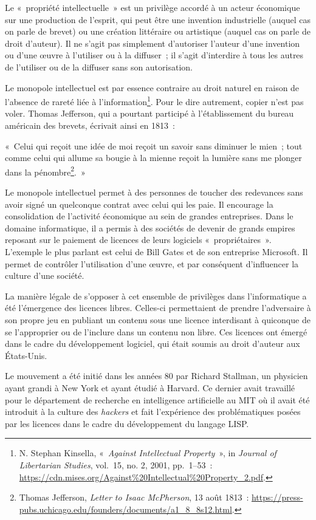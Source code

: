 \documentclass[
  a5paper,
  smalldemyvopaper,10pt,twoside,onecolumn,openright,extrafontsizes,hidelinks]{memoir}
\begin{document}
Le «~propriété intellectuelle~» est un privilège accordé à un acteur
économique sur une production de l'esprit, qui peut être une invention
industrielle (auquel cas on parle de brevet) ou une création littéraire
ou artistique (auquel cas on parle de droit d'auteur). Il ne s'agit pas
simplement d'autoriser l'auteur d'une invention ou d'une œuvre à
l'utiliser ou à la diffuser~; il s'agit d'interdire à tous les autres de
l'utiliser ou de la diffuser sans son autorisation.

Le monopole intellectuel est par essence contraire au droit naturel en
raison de l'absence de rareté liée à l'information\footnote{N. Stephan
  Kinsella, «~\emph{Against Intellectual Property}~», in \emph{Journal
  of Libertarian Studies}, vol.~15, no. 2, 2001, pp.~1--53~:
  \url{https://cdn.mises.org/Against\%20Intellectual\%20Property_2.pdf}.}.
Pour le dire autrement, copier n'est pas voler. Thomas Jefferson, qui a
pourtant participé à l'établissement du bureau américain des brevets,
écrivait ainsi en 1813~:

«~Celui qui reçoit une idée de moi reçoit un savoir sans diminuer le
mien~; tout comme celui qui allume sa bougie à la mienne reçoit la
lumière sans me plonger dans la pénombre\footnote{Thomas Jefferson,
  \emph{Letter to Isaac McPherson}, 13 août 1813~:
  \url{https://press-pubs.uchicago.edu/founders/documents/a1_8_8s12.html}.}.~»

Le monopole intellectuel permet à des personnes de toucher des
redevances sans avoir signé un quelconque contrat avec celui qui les
paie. Il encourage la consolidation de l'activité économique au sein de
grandes entreprises. Dans le domaine informatique, il a permis à des
sociétés de devenir de grands empires reposant sur le paiement de
licences de leurs logiciels «~propriétaires~». L'exemple le plus parlant
est celui de Bill Gates et de son entreprise Microsoft. Il permet de
contrôler l'utilisation d'une œuvre, et par conséquent d'influencer la
culture d'une société.

La manière légale de s'opposer à cet ensemble de privilèges dans
l'informatique a été l'émergence des licences libres. Celles-ci
permettaient de prendre l'adversaire à son propre jeu en publiant un
contenu sous une licence interdisant à quiconque de se l'approprier ou
de l'inclure dans un contenu non libre. Ces licences ont émergé dans le
cadre du développement logiciel, qui était soumis au droit d'auteur aux
États-Unis.

Le mouvement a été initié dans les années 80 par Richard Stallman, un
physicien ayant grandi à New York et ayant étudié à Harvard. Ce dernier
avait travaillé pour le département de recherche en intelligence
artificielle au MIT où il avait été introduit à la culture des
\emph{hackers} et fait l'expérience des problématiques posées par les
licences dans le cadre du développement du langage LISP.
\end{document}
